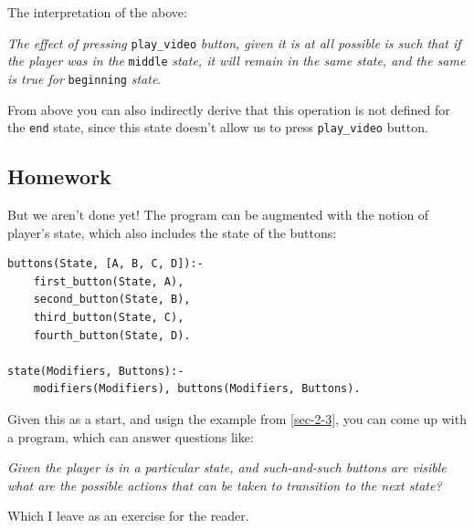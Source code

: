 \documentclass[11pt]{article}
\begin{document}
The interpretation of the above:

\emph{The effect of pressing} \texttt{play\_video} \emph{button, given it is at all possible}
\emph{is such that if the player was in the} \texttt{middle} \emph{state, it will remain in}
\emph{the same state, and the same is true for} \texttt{beginning} \emph{state}.

From above you can also indirectly derive that this operation is not defined
for the \texttt{end} state, since this state doesn't allow us to press \texttt{play\_video}
button.
\subsection{Homework}
\label{sec-2-5}

But we aren't done yet!  The program can be augmented with the notion of
player's state, which also includes the state of the buttons:

\begin{verbatim}
buttons(State, [A, B, C, D]):-
    first_button(State, A),
    second_button(State, B),
    third_button(State, C),
    fourth_button(State, D).

state(Modifiers, Buttons):-
    modifiers(Modifiers), buttons(Modifiers, Buttons).
\end{verbatim}

Given this as a start, and usign the example from \ref{sec-2-3}, you can come
up with a program, which can answer questions like:

\emph{Given the player is in a particular state, and such-and-such buttons are visible}
\emph{what are the possible actions that can be taken to transition to the next state?}

Which I leave as an exercise for the reader.
\end{document}

